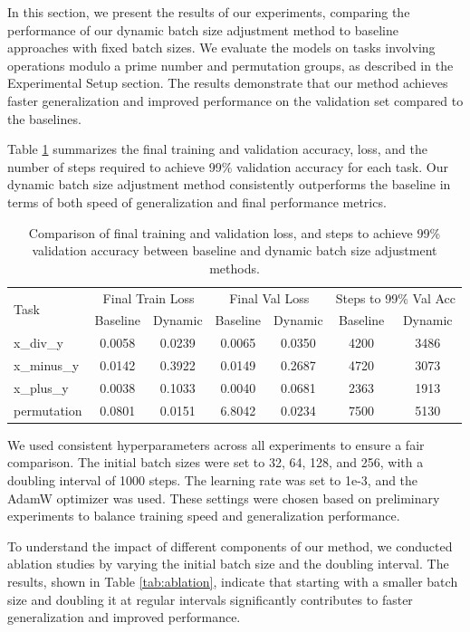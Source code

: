 \documentclass{article} %
\begin{document}
In this section, we present the results of our experiments, comparing the performance of our dynamic batch size adjustment method to baseline approaches with fixed batch sizes. We evaluate the models on tasks involving operations modulo a prime number and permutation groups, as described in the Experimental Setup section. The results demonstrate that our method achieves faster generalization and improved performance on the validation set compared to the baselines.

Table \ref{tab:results} summarizes the final training and validation accuracy, loss, and the number of steps required to achieve 99\% validation accuracy for each task. Our dynamic batch size adjustment method consistently outperforms the baseline in terms of both speed of generalization and final performance metrics.

\begin{table}[h]
    \centering
    \begin{tabular}{lcccccc}
        \toprule
        \multirow{2}{*}{Task} & \multicolumn{2}{c}{Final Train Loss} & \multicolumn{2}{c}{Final Val Loss} & \multicolumn{2}{c}{Steps to 99\% Val Acc} \\
        & Baseline & Dynamic & Baseline & Dynamic & Baseline & Dynamic \\
        \midrule
        x\_div\_y & 0.0058 & 0.0239 & 0.0065 & 0.0350 & 4200 & 3486 \\
        x\_minus\_y & 0.0142 & 0.3922 & 0.0149 & 0.2687 & 4720 & 3073 \\
        x\_plus\_y & 0.0038 & 0.1033 & 0.0040 & 0.0681 & 2363 & 1913 \\
        permutation & 0.0801 & 0.0151 & 6.8042 & 0.0234 & 7500 & 5130 \\
        \bottomrule
    \end{tabular}
    \caption{Comparison of final training and validation loss, and steps to achieve 99\% validation accuracy between baseline and dynamic batch size adjustment methods.}
    \label{tab:results}
\end{table}

We used consistent hyperparameters across all experiments to ensure a fair comparison. The initial batch sizes were set to 32, 64, 128, and 256, with a doubling interval of 1000 steps. The learning rate was set to 1e-3, and the AdamW optimizer was used. These settings were chosen based on preliminary experiments to balance training speed and generalization performance.

To understand the impact of different components of our method, we conducted ablation studies by varying the initial batch size and the doubling interval. The results, shown in Table \ref{tab:ablation}, indicate that starting with a smaller batch size and doubling it at regular intervals significantly contributes to faster generalization and improved performance.
\end{document}
